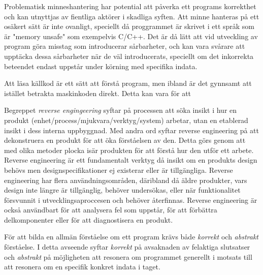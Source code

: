 Problematisk minneshantering har potential att påverka ett programs korrekthet och 
kan utnyttjas av fientliga aktörer i skadliga syften. Att minne hanteras på ett 
osäkert sätt är inte ovanligt, speciellt då proggrammet är skrivet i ett språk som är 
"memory unsafe" som exempelvis C/C++. Det är då lätt att vid utveckling av program 
göra misstag som introducerar sårbarheter, och kan vara svårare att upptäcka dessa 
sårbarheter när de väl introducerats, speciellt om det inkorrekta beteendet endast 
uppstår under körning med specifika indata.

Att läsa källkod är ett sätt att förstå program, men ibland är det gynnsamt att istället betrakta
maskinkoden direkt. Detta kan vara för att

Begreppet \textit{reverse engingeering} syftar på processen att söka insikt i hur en produkt 
(enhet/process/mjukvara/verktyg/system) arbetar, utan en etablerad insikt i dess interna 
uppbyggnad. Med andra ord syftar reverse engineering på att dekonstruera en produkt för att 
öka förståelsen av den. Detta görs genom att med olika metoder plocka isär produkten för 
att förstå hur den utför ett arbete. Reverse engineering är ett fundamentalt verktyg då insikt 
om en produkts design behövs men designspecifikationer ej existerar eller är tillgängliga. 
Reverse engineering har flera användningsområden, däribland då äldre produkter, vars design 
inte längre är tillgänglig, behöver undersökas, eller när funktionalitet försvunnit i 
utvecklingsaproccesen och behöver återfinnas. Reverse engineering är också användbart för 
att analysera fel som uppstår, för att förbättra delkomponenter eller för att diagnostisera 
en produkt.

För att bilda en allmän förståelse om ett program krävs både \textit{korrekt} och
\textit{abstrakt} förståelse. I detta avseende syftar \textit{korrekt} på
avsaknaden av felaktiga slutsatser och \textit{abstrakt} på möjligheten att
resonera om programmet generellt i motsats till att resonera om en specifik
konkret indata i taget.


